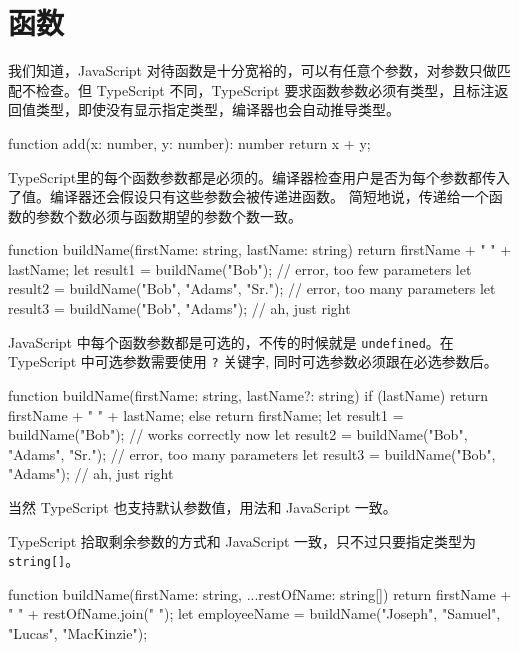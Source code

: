 \section{函数}

我们知道，JavaScript 对待函数是十分宽裕的，可以有任意个参数，对参数只做匹配不检查。但 TypeScript 不同，TypeScript 要求函数参数必须有类型，且标注返回值类型，即使没有显示指定类型，编译器也会自动推导类型。

\begin{TypeScript}
function add(x: number, y: number): number {
    return x + y;
}
\end{TypeScript}

TypeScript里的每个函数参数都是必须的。编译器检查用户是否为每个参数都传入了值。编译器还会假设只有这些参数会被传递进函数。 简短地说，传递给一个函数的参数个数必须与函数期望的参数个数一致。

\begin{TypeScript}
function buildName(firstName: string, lastName: string) {
    return firstName + " " + lastName;
}
let result1 = buildName("Bob");                     // error, too few parameters
let result2 = buildName("Bob", "Adams", "Sr.");     // error, too many parameters
let result3 = buildName("Bob", "Adams");            // ah, just right
\end{TypeScript}

JavaScript 中每个函数参数都是可选的，不传的时候就是 \texttt{undefined}。在 TypeScript 中可选参数需要使用 \texttt{?} 关键字, 同时可选参数必须跟在必选参数后。

\begin{TypeScript}
function buildName(firstName: string, lastName?: string) {
    if (lastName)
        return firstName + " " + lastName;
    else
        return firstName;
}
let result1 = buildName("Bob");                     // works correctly now
let result2 = buildName("Bob", "Adams", "Sr.");     // error, too many parameters
let result3 = buildName("Bob", "Adams");            // ah, just right
\end{TypeScript}

当然 TypeScript 也支持默认参数值，用法和 JavaScript 一致。

TypeScript 拾取剩余参数的方式和 JavaScript 一致，只不过只要指定类型为 \texttt{string[]}。

\begin{TypeScript}
function buildName(firstName: string, ...restOfName: string[]) {
  return firstName + " " + restOfName.join(" ");
}
let employeeName = buildName("Joseph", "Samuel", "Lucas", "MacKinzie");
\end{TypeScript}

